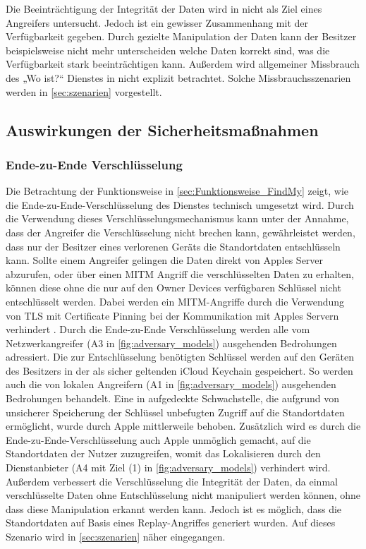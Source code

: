 Die Beeinträchtigung der Integrität der Daten wird in \cite{Heinrich_FindMy} nicht als Ziel eines Angreifers untersucht.
Jedoch ist ein gewisser Zusammenhang mit der Verfügbarkeit gegeben.
Durch gezielte Manipulation der Daten kann der Besitzer beispielsweise nicht mehr unterscheiden welche Daten korrekt sind, was die Verfügbarkeit stark beeinträchtigen kann.
Außerdem wird allgemeiner Missbrauch des „Wo ist?“ Dienstes in \cite{Heinrich_FindMy} nicht explizit betrachtet.
Solche Missbrauchsszenarien werden in \autoref{sec:szenarien} vorgestellt.


\subsection{Auswirkungen der Sicherheitsmaßnahmen}

\subsubsection{Ende-zu-Ende Verschlüsselung}
Die Betrachtung der Funktionsweise in \autoref{sec:Funktionsweise_FindMy} zeigt, wie die Ende-zu-Ende-Verschlüsselung des Dienstes technisch umgesetzt wird.
Durch die Verwendung dieses Verschlüsselungsmechanismus kann unter der Annahme, dass der Angreifer die Verschlüsselung nicht brechen kann, gewährleistet werden, dass nur der Besitzer eines verlorenen Geräts die Standortdaten entschlüsseln kann.
Sollte einem Angreifer gelingen die Daten direkt von Apples Server abzurufen, oder über einen \ac{MITM} Angriff die verschlüsselten Daten zu erhalten, können diese ohne die nur auf den Owner Devices verfügbaren Schlüssel nicht entschlüsselt werden.
Dabei werden ein \ac{MITM}-Angriffe durch die Verwendung von \ac{TLS} mit Certificate Pinning bei der Kommunikation mit Apples Servern verhindert \cite{Heinrich_FindMy}.
Durch die Ende-zu-Ende Verschlüsselung werden alle vom Netzwerkangreifer (A3 in \autoref{fig:adversary_models}) ausgehenden Bedrohungen adressiert.
Die zur Entschlüsselung benötigten Schlüssel werden auf den Geräten des Besitzers in der als sicher geltenden iCloud Keychain gespeichert.
So werden auch die von lokalen Angreifern (A1 in \autoref{fig:adversary_models}) ausgehenden Bedrohungen behandelt.
Eine in \cite{Heinrich_FindMy} aufgedeckte Schwachstelle, die aufgrund von unsicherer Speicherung der Schlüssel unbefugten Zugriff auf die Standortdaten ermöglicht, wurde durch Apple mittlerweile behoben.
Zusätzlich wird es durch die Ende-zu-Ende-Verschlüsselung auch Apple unmöglich gemacht, auf die Standortdaten der Nutzer zuzugreifen, womit das Lokalisieren durch den Dienstanbieter (A4 mit Ziel (1) in \autoref{fig:adversary_models}) verhindert wird.
Außerdem verbessert die Verschlüsselung die Integrität der Daten, da einmal verschlüsselte Daten ohne Entschlüsselung nicht manipuliert werden können, ohne dass diese Manipulation erkannt werden kann.
Jedoch ist es möglich, dass die Standortdaten auf Basis eines Replay-Angriffes generiert wurden.
Auf dieses Szenario wird in \autoref{sec:szenarien} näher eingegangen.


